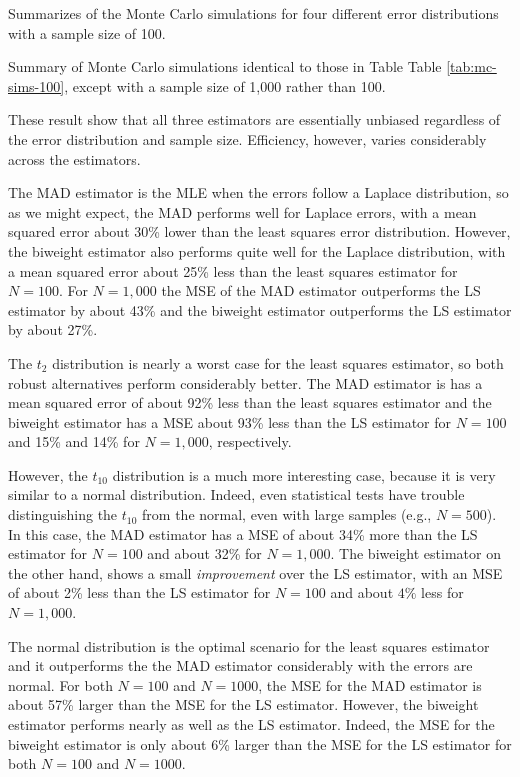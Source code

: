 \documentclass[12pt]{article}
\begin{document}
\begin{table}
{\tiny

}
\caption{Summarizes of the Monte Carlo simulations for four different error distributions with a sample size of 100.}\label{tab:mc-sims-100}
\end{table}

\begin{table}
{\tiny

}
\caption{Summary of Monte Carlo simulations identical to those in Table Table \ref{tab:mc-sims-100}, except with a sample size of 1,000 rather than 100. }\label{tab:mc-sims-1000}
\end{table}

These result show that all three estimators are essentially unbiased regardless of the error distribution and sample size. Efficiency, however, varies considerably across the estimators.

The MAD estimator is the MLE when the errors follow a Laplace distribution, so as we might expect, the MAD performs well for Laplace errors, with a mean squared error about 30\% lower than the least squares error distribution. However, the biweight estimator also performs quite well for the Laplace distribution, with a mean squared error about 25\% less than the least squares estimator for $N = 100$. For $N = 1,000$ the MSE of the MAD estimator outperforms the LS estimator by about 43\% and the biweight estimator outperforms the LS estimator by about 27\%.

The $t_2$ distribution is nearly a worst case for the least squares estimator, so both robust alternatives perform considerably better. The MAD estimator is has a mean squared error of about 92\% less than the least squares estimator and the biweight estimator has a MSE about 93\% less than the LS estimator for $N = 100$ and 15\% and 14\% for $N = 1,000$, respectively. 

However, the $t_{10}$ distribution is a much more interesting case, because it is very similar to a normal distribution. Indeed, even statistical tests have trouble distinguishing the $t_{10}$ from the normal, even with large samples (e.g., $N = 500$). In this case, the MAD estimator has a MSE of about 34\% more than the LS estimator for $N = 100$ and about 32\% for $N = 1,000$. The biweight estimator on the other hand, shows a small \textit{improvement} over the LS estimator, with an MSE of about 2\% less than the LS estimator for $N = 100$ and about $4\%$ less for $N = 1,000$.

The normal distribution is the optimal scenario for the least squares estimator and it outperforms the the MAD estimator considerably with the errors are normal. For both $N = 100$ and $N = 1000$, the MSE for the MAD estimator is about 57\% larger than the MSE for the LS estimator. However, the biweight estimator performs nearly as well as the LS estimator. Indeed, the MSE for the biweight estimator is only about 6\% larger than the MSE for the LS estimator for both $N = 100$ and $N = 1000$.
\end{document}
